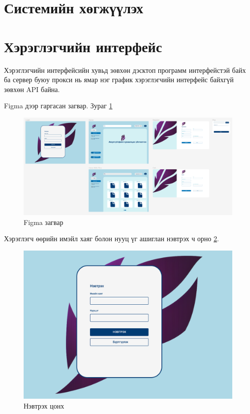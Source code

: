 \section{Системийн хөгжүүлэх}

\section*{Хэрэглэгчийн интерфейс}
Хэрэглэгчийн интерфейсийн хувьд зөвхөн дэсктоп программ интерфейстэй байх ба сервер буюу прокси нь ямар нэг график хэрэглэгчийн интерфейс байхгүй зөвхөн API байна. 

Figma дээр гаргасан загвар. Зураг \ref*{fig:figma}
\begin{figure}[H]
    \centering
    \includegraphics[scale=0.3]{Figures/ui/figma.png}
    \caption[Usecase diagram]{Figma загвар}
    \label{fig:figma}
\end{figure}

\noindent Хэрэглэгч өөрийн имэйл хаяг болон нууц үг ашиглан нэвтрэх ч орно \ref{fig:login}. 
\begin{figure}[H]
    \centering
    \includegraphics[scale=0.25]{Figures/ui/login.png}
    \caption[Usecase diagram]{Нэвтрэх цонх}
    \label{fig:login}
\end{figure}

